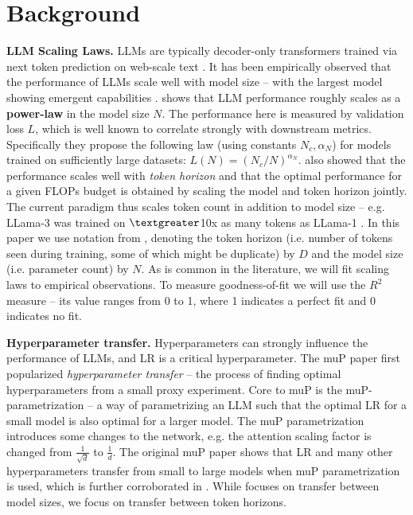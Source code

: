 
\section{Background}


\textbf{LLM Scaling Laws.} LLMs are typically decoder-only transformers \citep{vaswani2017attention} trained via next token prediction on web-scale text \citep{radford2019language}. It has been empirically observed that the performance of LLMs scale well with model size -- with the largest model showing emergent capabilities \citep{wei2022emergent}. \cite{kaplan2020scalinglaw} shows that LLM performance roughly scales as a \textbf{power-law} in the model size $N$. The performance here is measured by validation loss $L$, which is well known to correlate strongly with downstream metrics. Specifically they propose the following law (using constants $N_c, \alpha_N$) for models trained on sufficiently large datasets: $L(N) = (N_c/N)^{\alpha_N}$. \citet{hoffmann2022training} also showed that the performance scales well with \textit{token horizon} and that the optimal performance for a given FLOPs budget is obtained by scaling the model and token horizon jointly. The current paradigm thus scales token count in addition to model size -- e.g. LLama-3 was trained on $\textgreater$10x as many tokens as LLama-1 \citep{llama3}. In this paper we use notation from \cite{kaplan2020scalinglaw}, denoting the token horizon (i.e. number of tokens seen during training, some of which might be duplicate) by $D$ and the model size (i.e. parameter count) by $N$. As is common in the literature, we will fit scaling laws to empirical observations.  To measure goodness-of-fit we will use the $R^2$ measure -- its value ranges from 0 to 1, where 1 indicates a perfect fit and 0 indicates no fit. 





\textbf{Hyperparameter transfer.} Hyperparameters can strongly influence the performance of LLMs, and LR is a critical hyperparameter. The muP paper \citep{mup} first popularized \textit{hyperparameter transfer} -- the process of finding optimal hyperparameters from a small proxy experiment. Core to muP is the muP-parametrization -- a way of parametrizing an LLM such that the optimal LR for a small model is also optimal for a larger model. The muP parametrization introduces some changes to the network, e.g. the attention scaling factor is changed from $\frac{1}{\sqrt{d}}$ to $\frac{1}{d}$. The original muP paper shows that LR and many other hyperparameters transfer from small to large models when muP parametrization is used, which is further corroborated in \cite{testingmup}. While \cite{mup} focuses on transfer between model sizes, we focus on transfer between token horizons.



